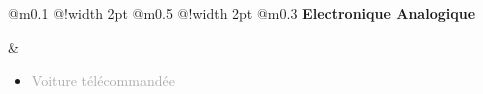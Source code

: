 \documentclass{article}
\begin{document}
\begin{tabular}
    {
        @{}m{}
        @{\hspace{0.001\textwidth}}!{\color{secondaryBlue}\vline width 2pt} %
        @{}m{0.5\textwidth}
        @{\hspace{0.025\textwidth}}!{\color{secondaryBlue}\vline width 2pt} %
        @{{\hspace{0.001\textwidth}}}m{0.3\textwidth}
    }
    \textcolor{secondaryBlue}
    {
        \textbf{Electronique Analogique}
    } 

    &
    \begin{itemize}
        [label={}, topsep=8pt, partopsep=0pt, itemsep=0.5pt, parsep=2pt,after=\vspace*{-\baselineskip}]
        \setlength{\itemsep}{10pt}
        \item \textcolor{darkGray}{Voiture télécommandée}
        \begin{itemize}
        [label={\textcolor{gray!100}{\checkmark}}, topsep=8pt, partopsep=0pt, itemsep=0.5pt, parsep=2pt, after=\vspace*{-\baselineskip}] 


\end{itemize}
\end{itemize}
\end{tabular}
\end{document}
